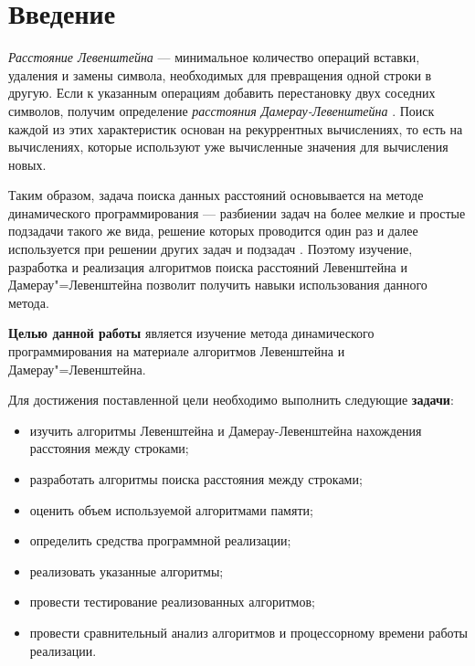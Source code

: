 \chapter*{Введение}

\textit{Расстояние Левенштейна} --- минимальное количество операций вставки,
удаления и замены символа, необходимых для превращения одной строки в другую.
Если к указанным операциям добавить перестановку двух соседних символов,
получим определение \textit{расстояния Дамерау-Левенштейна} \cite{bib01}. Поиск
каждой из этих характеристик основан на рекуррентных вычислениях, то есть на
вычислениях, которые используют уже вычисленные значения для вычисления новых.

Таким образом, задача поиска данных расстояний основывается на методе
динамического программирования --- разбиении задач на более мелкие и простые
подзадачи такого же вида, решение которых проводится один раз и далее
используется при решении других задач и подзадач \cite{bib02}. Поэтому изучение,
разработка и реализация алгоритмов поиска расстояний Левенштейна и
Дамерау"=Левенштейна позволит получить навыки использования данного метода.

\textbf{Целью данной работы} является изучение метода динамического
программирования на материале алгоритмов Левенштейна и Дамерау"=Левенштейна. 

Для достижения поставленной цели необходимо выполнить следующие
\textbf{задачи}:
\begin{itemize}[left=\parindent]
    \item изучить алгоритмы Левенштейна и Дамерау-Левенштейна нахождения
          расстояния между строками;
    \item разработать алгоритмы поиска расстояния между строками;
    \item оценить объем используемой алгоритмами памяти;
    \item определить средства программной реализации;
    \item реализовать указанные алгоритмы;
    \item провести тестирование реализованных алгоритмов;
    \item провести сравнительный анализ алгоритмов и процессорному времени
          работы реализации.
\end{itemize}
